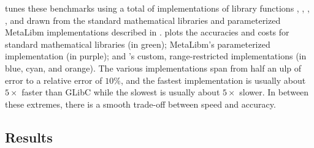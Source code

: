 \documentclass[paper.tex]{subfiles}
\begin{document}
\name tunes these benchmarks using a total
  of \nOptunerImpls implementations
  of library functions , , , , and 
  drawn from
  the standard mathematical libraries
  and parameterized MetaLibm implementations
  described in .
 plots the accuracies and costs
  for standard mathematical libraries (in green);
  MetaLibm's parameterized  implementation (in purple);
  and \name's custom, range-restricted implementations
  (in blue, cyan, and orange).
The various implementations span
  from half an ulp of error to a relative error of $10\%$,
  and the fastest implementation
  is usually about $5\times$ faster than GLibC
  while the slowest is usually about $5\times$ slower.
In between these extremes,
  there is a smooth trade-off between speed and accuracy.

\subsection{Results}
\end{document}
